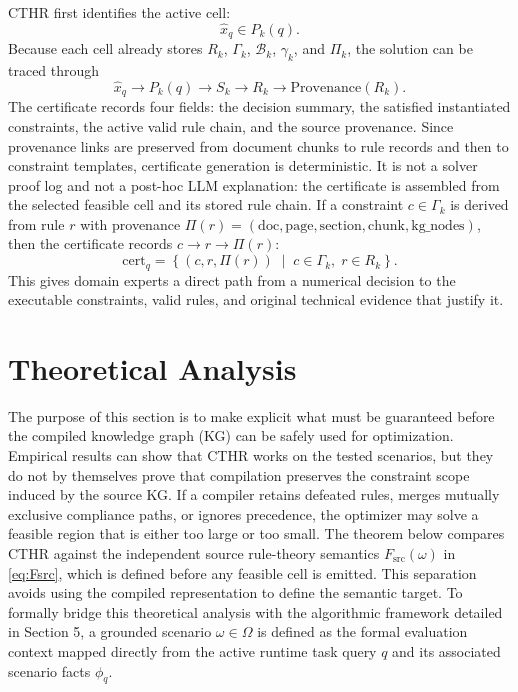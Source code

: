 ﻿\documentclass[a4paper,fleqn]{cas-dc}
\newcommand{\CTHR}{\textsc{CTHR}}
\begin{document}
CTHR first identifies the active cell:
\begin{equation}
\hat{x}_q \in P_k(q).
\end{equation}
Because each cell already stores $R_k$, $\Gamma_k$, $\mathcal{B}_k$, $\gamma_k$, and $\Pi_k$, the solution can be traced through
\begin{equation}
\hat{x}_q \rightarrow P_k(q) \rightarrow S_k \rightarrow R_k \rightarrow \mathrm{Provenance}(R_k).
\end{equation}
The certificate records four fields: the decision summary, the satisfied
instantiated constraints, the active valid rule chain, and the source
provenance. Since provenance links are preserved from document chunks to rule
records and then to constraint templates, certificate generation is
deterministic. It is not a solver proof log and not a post-hoc LLM explanation:
the certificate is assembled from the selected feasible cell and its stored rule
chain. If a constraint $c\in\Gamma_k$ is derived from rule $r$ with provenance
$\Pi(r)=(\mathrm{doc},\mathrm{page},\mathrm{section},\mathrm{chunk},\mathrm{kg\_nodes})$, then the certificate records $c\rightarrow r\rightarrow\Pi(r)$:
\begin{equation}
\mathrm{cert}_q = \left\{ (c, r, \Pi(r)) \;\middle|\; c \in \Gamma_k, \; r \in R_k \right\}.
\end{equation}
This gives domain experts a direct path from a numerical decision to the executable constraints, valid rules, and original technical evidence that justify it.


\section{Theoretical Analysis}
\label{sec:theory}

The purpose of this section is to make explicit what must be guaranteed before the compiled knowledge graph (KG) can be safely used for optimization. Empirical results can show that \CTHR{} works on the tested scenarios, but they do not by themselves prove that compilation preserves the constraint scope induced by the source KG. If a compiler retains defeated rules, merges mutually exclusive compliance paths, or ignores precedence, the optimizer may solve a feasible region that is either too large or too small. The theorem below compares \CTHR{} against the independent source rule-theory semantics $F_{\mathrm{src}}(\omega)$ in \eqref{eq:Fsrc}, which is defined before any feasible cell is emitted. This separation avoids using the compiled representation to define the semantic target. To formally bridge this theoretical analysis with the algorithmic framework detailed in Section 5, a grounded scenario $\omega \in \Omega$ is defined as the formal evaluation context mapped directly from the active runtime task query $q$ and its associated scenario facts $\phi_q$.
\end{document}
